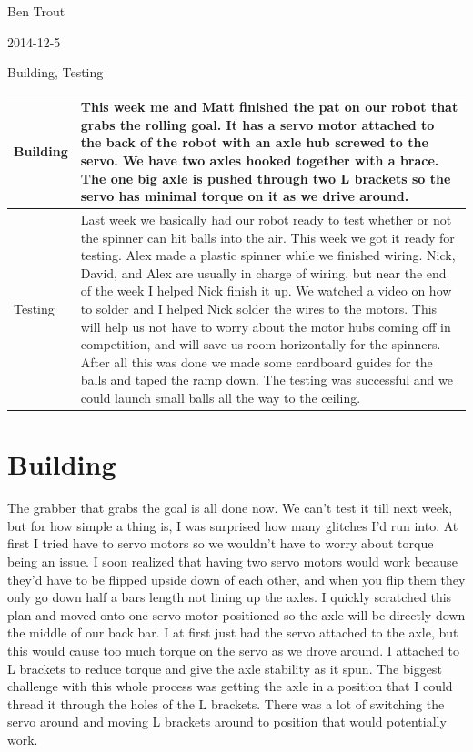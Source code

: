Ben Trout

2014-12-5

Building, Testing 

\begin{tabular}{|p{5cm}|p{5cm}|}
\hline
Building&
This week me and Matt finished the pat on our robot that grabs the rolling goal. It has a servo motor attached to the back of the robot with an axle hub screwed to the servo. We have two axles hooked together with a brace. The one big axle is pushed through two L brackets so the servo has minimal torque on it as we drive around.  
\\
\hline
Testing&
Last week we basically had our robot ready to test whether or not the spinner can hit balls into the air. This week we got it ready for testing. Alex made a plastic spinner while we finished wiring. Nick, David, and Alex are usually in charge of wiring, but near the end of the week I helped Nick finish it up. We watched a video on how to solder and I helped Nick solder the wires to the motors. This will help us not have to worry about the motor hubs coming off in competition, and will save us room horizontally for the spinners. After all this was done we made some cardboard guides for the balls and taped the ramp down. The testing was successful and we could launch small balls all the way to the ceiling. 
\\
\hline
\end{tabular}

\section*{Building}
The grabber that grabs the goal is all done now. We can’t test it till next week, but for how simple a thing is, I was surprised how many glitches I’d run into. At first I tried have to servo motors so we wouldn’t have to worry about torque being an issue. I soon realized that having two servo motors would work because they’d have to be flipped upside down of each other, and when you flip them they only go down half a bars length not lining up the axles. I quickly scratched this plan and moved onto one servo motor positioned so the axle will be directly down the middle of our back bar. I at first just had the servo attached to the axle, but this would cause too much torque on the servo as we drove around. I attached to L brackets to reduce torque and give the axle stability as it spun. The biggest challenge with this whole process was getting the axle in a position that I could thread it through the holes of the L brackets. There was a lot of switching the servo around and moving L brackets around to position that would potentially work.  

